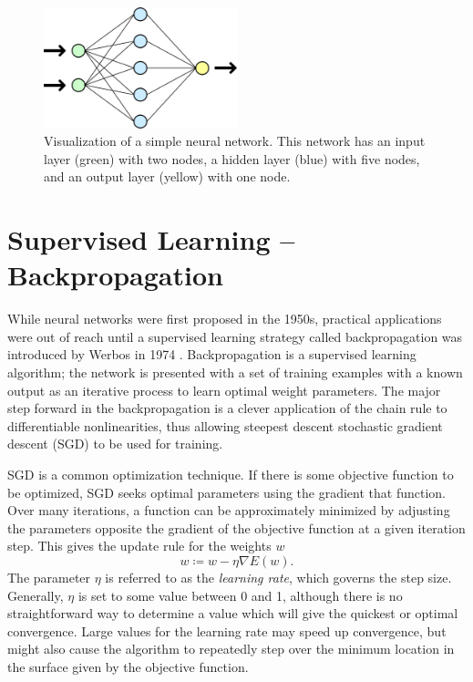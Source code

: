 \begin{figure}[t]
  \begin{center}
    \includegraphics[width=0.5\textwidth]{figures/figures/basicNN.png}
  \end{center}
  \caption[Visualization of a simple neural network ]{Visualization of a simple neural network.  This network has an input layer (green) with two nodes, a hidden layer (blue) with five nodes, and an output layer (yellow) with one node.}

  \label{nnet}
\end{figure}


\section{Supervised Learning -- Backpropagation}
\label{backprop}

While neural networks were first proposed in the 1950s, practical applications were out of reach until a supervised learning strategy called backpropagation was introduced by Werbos in 1974 \cite{werbos1974beyond}.  Backpropagation is a supervised learning algorithm; the network is presented with a set of training examples with a known output as an iterative process to learn optimal weight parameters.  The major step forward in the backpropagation is a clever application of the chain rule to differentiable nonlinearities, thus allowing steepest descent stochastic gradient descent (SGD) to be used for training.

SGD is a common optimization technique.  If there is some objective function to be optimized, SGD seeks optimal parameters using the gradient that function.  Over many iterations, a function can be approximately minimized by adjusting the parameters opposite the gradient of the objective function at a given iteration step.  This gives the update rule for the weights $w$
\begin{equation}
w \coloneqq w - \eta \nabla E(w).
\end{equation}
The parameter $\eta$ is referred to as the \textit{learning rate}, which governs the step size.  Generally, $\eta$ is set to some value between 0 and 1, although there is no straightforward way to determine a value which will give the quickest or optimal convergence.  Large values for the learning rate may speed up convergence, but might also cause the algorithm to repeatedly step over the minimum location in the surface given by the objective function.


